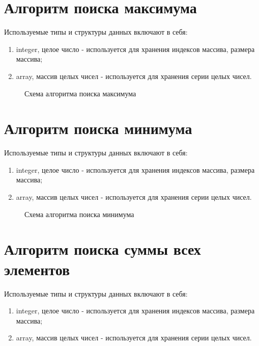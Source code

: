 \section{Алгоритм поиска максимума}

Используемые типы и структуры данных включают в себя:
\begin{enumerate}
	\item integer, целое число - используется для хранения индексов массива, размера массива;
	\item array, массив целых чисел - используется для хранения серии целых чисел.
\end{enumerate}

\newpage

\begin{figure}[ph!]
	\caption{Схема алгоритма поиска максимума}
\end{figure}

\section{Алгоритм поиска минимума}

Используемые типы и структуры данных включают в себя:
\begin{enumerate}
	\item integer, целое число - используется для хранения индексов массива, размера массива;
	\item array, массив целых чисел - используется для хранения серии целых чисел.
\end{enumerate}

\newpage

\begin{figure}[ph!]
	\caption{Схема алгоритма поиска минимума}
\end{figure}

\section{Алгоритм поиска суммы всех элементов}

Используемые типы и структуры данных включают в себя:
\begin{enumerate}
	\item integer, целое число - используется для хранения индексов массива, размера массива;
	\item array, массив целых чисел - используется для хранения серии целых чисел.
\end{enumerate}

